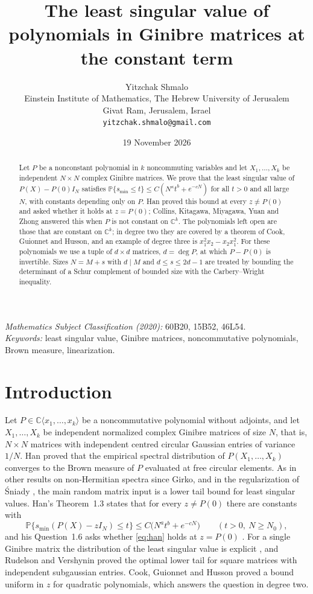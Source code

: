 \documentclass[11pt]{article}
\title{The least singular value of polynomials in Ginibre matrices at the constant term}
\author{Yitzchak Shmalo\\
Einstein Institute of Mathematics, The Hebrew University of Jerusalem\\
Givat Ram, Jerusalem, Israel\\
\texttt{yitzchak.shmalo@gmail.com}}
\date{19 November 2026}
\theoremstyle{remark}
\newcommand{\C}{\mathbb C}
\newcommand{\Prob}{\mathbb P}
\newcommand{\smin}{s_{\min}}
\begin{document}
\maketitle

\begin{abstract}
Let $P$ be a nonconstant polynomial in $k$ noncommuting variables and let $X_1,\dots,X_k$ be independent $N\times N$ complex Ginibre matrices. We prove that the least singular value of $P(X)-P(0)I_N$ satisfies $\Prob\{\smin\le t\}\le C(N^{\kappa}t^b+e^{-cN})$ for all $t>0$ and all large $N$, with constants depending only on $P$. Han proved this bound at every $z\ne P(0)$ and asked whether it holds at $z=P(0)$; Collins, Kitagawa, Miyagawa, Yuan and Zhong answered this when $P$ is not constant on $\C^k$. The polynomials left open are those that are constant on $\C^k$; in degree two they are covered by a theorem of Cook, Guionnet and Husson, and an example of degree three is $x_1^2x_2-x_2x_1^2$. For these polynomials we use a tuple of $d\times d$ matrices, $d=\deg P$, at which $P-P(0)$ is invertible. Sizes $N=M+s$ with $d\mid M$ and $d\le s\le 2d-1$ are treated by bounding the determinant of a Schur complement of bounded size with the Carbery--Wright inequality.
\end{abstract}

\noindent\textit{Mathematics Subject Classification (2020):} 60B20, 15B52, 46L54.\\
\textit{Keywords:} least singular value, Ginibre matrices, noncommutative polynomials, Brown measure, linearization.

\section{Introduction}

Let $P\in\C\langle x_1,\dots,x_k\rangle$ be a noncommutative polynomial without adjoints, and let $X_1,\dots,X_k$ be independent normalized complex Ginibre matrices of size $N$, that is, $N\times N$ matrices with independent centred circular Gaussian entries of variance $1/N$. Han \cite{Han1} proved that the empirical spectral distribution of $P(X_1,\dots,X_k)$ converges to the Brown measure of $P$ evaluated at free circular elements. As in other results on non-Hermitian spectra since Girko, and in the regularization of \'Sniady \cite{Sn}, the main random matrix input is a lower tail bound for least singular values. Han's Theorem~1.3 states that for every $z\ne P(0)$ there are constants with
\begin{equation}\label{eq:han}
\Prob\{\smin(P(X)-zI_N)\le t\}\le C\bigl(N^{a}t^{b}+e^{-cN}\bigr)\qquad(t>0,\ N\ge N_0),
\end{equation}
and his Question~1.6 asks whether \eqref{eq:han} holds at $z=P(0)$ \cite{Han1}. For a single Ginibre matrix the distribution of the least singular value is explicit \cite{Ed}, and Rudelson and Vershynin \cite{RV} proved the optimal lower tail for square matrices with independent subgaussian entries. Cook, Guionnet and Husson \cite{CGH} proved a bound uniform in $z$ for quadratic polynomials, which answers the question in degree two.
\end{document}
